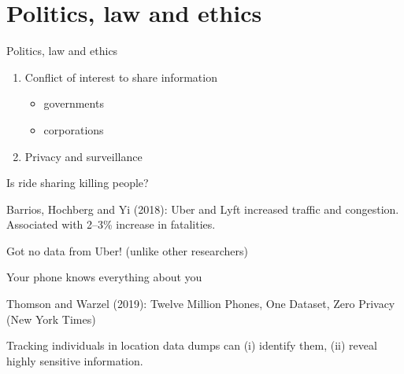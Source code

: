 \documentclass[ignorenonframetext,aspectratio=54,]{beamer}
\providecommand{\tightlist}{%
  \setlength{\itemsep}{0pt}\setlength{\parskip}{0pt}}
\begin{document}
\hypertarget{politics-law-and-ethics}{%
\section{Politics, law and ethics}\label{politics-law-and-ethics}}

\begin{frame}{Politics, law and ethics}
\protect\hypertarget{politics-law-and-ethics-1}{}

\begin{enumerate}
\tightlist
\item
  Conflict of interest to share information

  \begin{itemize}
  \tightlist
  \item
    governments
  \item
    corporations
  \end{itemize}
\item
  Privacy and surveillance
\end{enumerate}

\end{frame}

\begin{frame}{Is ride sharing killing people?}
\protect\hypertarget{is-ride-sharing-killing-people}{}

Barrios, Hochberg and Yi (2018): Uber and Lyft increased traffic and
congestion. Associated with 2--3\% increase in fatalities.

Got no data from Uber! (unlike other researchers)

\end{frame}

\begin{frame}{Your phone knows everything about you}
\protect\hypertarget{your-phone-knows-everything-about-you}{}

Thomson and Warzel (2019): Twelve Million Phones, One Dataset, Zero
Privacy (New York Times)

Tracking individuals in location data dumps can (i) identify them, (ii)
reveal highly sensitive information.

\end{frame}
\end{document}
